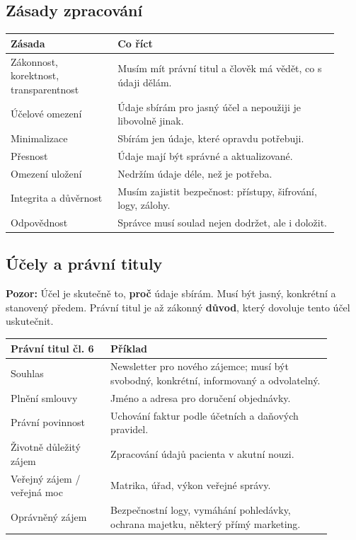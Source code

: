 \documentclass[11pt,a4paper]{article}
\newcommand{\pozor}[1]{\begin{tcolorbox}[breakable,enhanced,colback=red!7,colframe=red!30!black,boxrule=0pt,arc=1mm,left=5pt,right=5pt,top=5pt,bottom=5pt,before skip=6pt,after skip=6pt]\textbf{Pozor:} #1\end{tcolorbox}}
\begin{document}
\subsection*{Zásady zpracování}
\begin{longtable}{p{0.30\linewidth}p{0.62\linewidth}}
\toprule
\textbf{Zásada} & \textbf{Co říct}\\
\midrule
Zákonnost, korektnost, transparentnost & Musím mít právní titul a člověk má vědět, co s údaji dělám.\\
Účelové omezení & Údaje sbírám pro jasný účel a nepoužiji je libovolně jinak.\\
Minimalizace & Sbírám jen údaje, které opravdu potřebuji.\\
Přesnost & Údaje mají být správné a aktualizované.\\
Omezení uložení & Nedržím údaje déle, než je potřeba.\\
Integrita a důvěrnost & Musím zajistit bezpečnost: přístupy, šifrování, logy, zálohy.\\
Odpovědnost & Správce musí soulad nejen dodržet, ale i doložit.\\
\bottomrule
\end{longtable}

\subsection*{Účely a právní tituly}
\pozor{Účel je skutečně to, \textbf{proč} údaje sbírám. Musí být jasný, konkrétní a stanovený předem. Právní titul je až zákonný \textbf{důvod}, který dovoluje tento účel uskutečnit.}

\begin{longtable}{p{0.28\linewidth}p{0.62\linewidth}}
\toprule
\textbf{Právní titul čl. 6} & \textbf{Příklad}\\
\midrule
Souhlas & Newsletter pro nového zájemce; musí být svobodný, konkrétní, informovaný a odvolatelný.\\
Plnění smlouvy & Jméno a adresa pro doručení objednávky.\\
Právní povinnost & Uchování faktur podle účetních a daňových pravidel.\\
Životně důležitý zájem & Zpracování údajů pacienta v akutní nouzi.\\
Veřejný zájem / veřejná moc & Matrika, úřad, výkon veřejné správy.\\
Oprávněný zájem & Bezpečnostní logy, vymáhání pohledávky, ochrana majetku, některý přímý marketing.\\
\bottomrule
\end{longtable}
\end{document}
